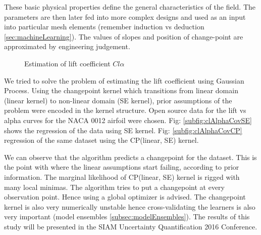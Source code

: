 These basic physical properties define the general characteristics of the field. The parameters are then later fed into more complex designs and used as an input into particular mesh elements (remember induction vs deduction \ref{sec:machineLearning}). The values of slopes and position of change-point are approximated by engineering judgement. 

\begin{figure}[!ht]
  \centering
	    \quad
	    \caption{Estimation of lift coefficient $Cl\alpha$}
\end{figure}


We tried to solve the problem of estimating the lift coefficient using Gaussian Process. Using the changepoint kernel which transitions from linear domain (linear kernel) to non-linear domain (SE kernel), prior assumptions of the problem were encoded in the kernel structure. Open source data for the lift vs alpha curves for the NACA 0012 airfoil were chosen. Fig: \ref{subfig:clAlphaCovSE} shows the regression of the data using SE kernel. Fig: \ref{subfig:clAlphaCovCP} regression of the same dataset using the CP(linear, SE) kernel. 

We can observe that the algorithm predicts a changepoint for the dataset. This is the point with where the linear assumptions start failing, according to prior information. The marginal likelihood of CP(linear, SE) kernel is rigged with many local minimas. The algorithm tries to put a changepoint at every observation point. Hence using a global optimizer is advised. The changepoint kernel is also very numerically unstable hence cross-validating the learners is also very important (model ensembles \ref{subsec:modelEnsembles}). The results of this study will be presented in the SIAM Uncertainty Quantification 2016 Conference.

